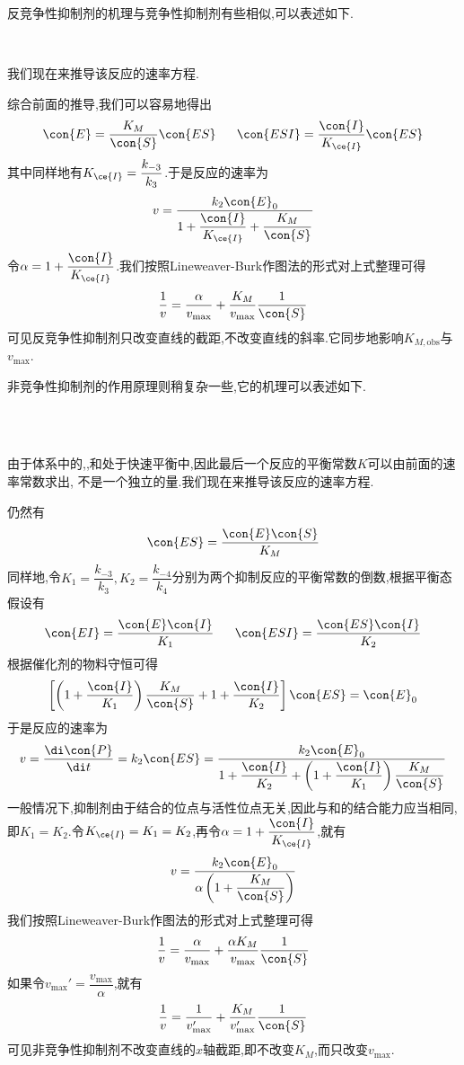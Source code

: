 \documentclass{ctexart}
\begin{document}
\indent 反竞争性抑制剂的机理与竞争性抑制剂有些相似,可以表述如下.
\begin{tightcenter}
    \\
\end{tightcenter}
我们现在来推导该反应的速率方程.
\begin{derivation}
    综合前面的推导,我们可以容易地得出
    \[\con{E}=\dfrac{K_M}{\con{S}}\con{ES}\ \ \ \ \ \con{ESI}=\dfrac{\con{I}}{K_{\ce{I}}}\con{ES}\]
    其中同样地有$K_{\ce{I}}=\dfrac{k_{-3}}{k_3}$.于是反应的速率为
    \[v=\dfrac{k_2\con{E}_0}{1+\dfrac{\con{I}}{K_{\ce{I}}}+\dfrac{K_M}{\con{S}}}\]
    令$\alpha=1+\dfrac{\con{I}}{K_{\ce{I}}}$.我们按照Lineweaver-Burk作图法的形式对上式整理可得
    \[\dfrac{1}{v}=\dfrac{\alpha}{v_{\max}}+\dfrac{K_M}{v_{\max}}\dfrac{1}{\con{S}}\]
    可见反竞争性抑制剂只改变直线的截距,不改变直线的斜率.它同步地影响$K_{M,\text{obs}}$与$v_{\max}$.
\end{derivation}
非竞争性抑制剂的作用原理则稍复杂一些,它的机理可以表述如下.
\begin{tightcenter}
    \\
    \ \ \ \ \ \\
\end{tightcenter}
由于体系中的,,和处于快速平衡中,因此最后一个反应的平衡常数$K$可以由前面的速率常数求出,%
不是一个独立的量.我们现在来推导该反应的速率方程.
\begin{derivation}
    仍然有
    \[\con{ES}=\dfrac{\con{E}\con{S}}{K_{M}}\]
    同样地,令$K_1=\dfrac{k_{-3}}{k_3},K_2=\dfrac{k_{-4}}{k_4}$分别为两个抑制反应的平衡常数的倒数,根据平衡态假设有
    \[\con{EI}=\dfrac{\con{E}\con{I}}{K_1}\ \ \ \ \ \con{ESI}=\dfrac{\con{ES}\con{I}}{K_2}\]
    根据催化剂的物料守恒可得
    \[\left[\left(1+\dfrac{\con{I}}{K_1}\right)\dfrac{K_M}{\con{S}}+1+\dfrac{\con{I}}{K_2}\right]\con{ES}=\con{E}_0\]
    于是反应的速率为
    \[v=\dfrac{\di\con{P}}{\di t}=k_2\con{ES}=\dfrac{k_2\con{E}_0}{1+\dfrac{\con{I}}{K_2}+\left(1+\dfrac{\con{I}}{K_1}\right)\dfrac{K_M}{\con{S}}}\]
    一般情况下,抑制剂由于结合的位点与活性位点无关,因此与和的结合能力应当相同,即$K_1=K_2$.令$K_{\ce{I}}=K_1=K_2$,再令$\alpha=1+\dfrac{\con{I}}{K_{\ce{I}}}$,就有
    \[v=\dfrac{k_2\con{E}_0}{\alpha\left(1+\dfrac{K_M}{\con{S}}\right)}\]
    我们按照Lineweaver-Burk作图法的形式对上式整理可得
    \[\dfrac{1}{v}=\dfrac{\alpha}{v_{\max}}+\dfrac{\alpha K_M}{v_{\max}}\dfrac{1}{\con{S}}\]
    如果令$v_{\max}'=\dfrac{v_{\max}}{\alpha}$,就有
    \[\dfrac{1}{v}=\dfrac{1}{v_{\max}'}+\dfrac{K_M}{v_{\max}'}\dfrac{1}{\con{S}}\]
    可见非竞争性抑制剂不改变直线的$x$轴截距,即不改变$K_M$,而只改变$v_{\max}$.
\end{derivation}
\end{document}

